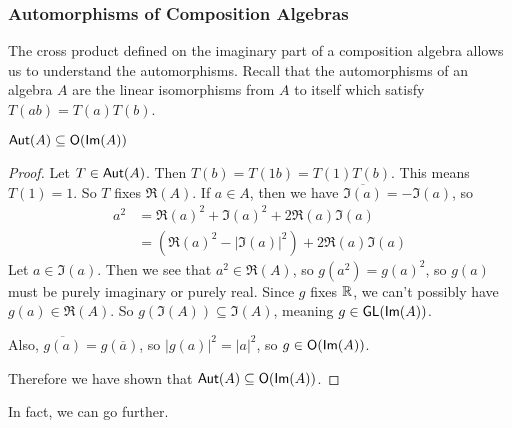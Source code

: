 \subsubsection{Automorphisms of Composition Algebras}
The cross product defined on the imaginary part of a composition algebra allows us to understand the automorphisms. Recall that the automorphisms of an algebra $A$ are the linear isomorphisms from $A$ to itself which satisfy $T(ab)=T(a)T(b)$.
\begin{lemma}
    $\operatorname{\textsf{Aut}}(A) \subseteq \operatorname{\textsf{O}}(\textsf{Im}(A))$
\end{lemma}
\begin{proof}
    Let $T\in \operatorname{\textsf{Aut}}(A)$. Then $T(b)=T(1b)=T(1)T(b)$. This means $T(1)=1$. So $T$ fixes $\Re(A)$. If $a\in A$, then we have $\overline{\Im(a)} = -\Im(a)$, so
    \begin{align*}
        a^2 &= \Re(a)^2+\Im(a)^2 + 2\Re(a)\Im(a)\\&= (\Re(a)^2-|\Im(a)|^2) + 2\Re(a)\Im(a)
    \end{align*}
    Let $a \in \Im(a)$. Then we see that $a^2 \in \Re(A)$, so $g(a^2)=g(a)^2$, so $g(a)$ must be purely imaginary or purely real. Since $g$ fixes $\operatorname{\mathbb{R}}$, we can't possibly have $g(a) \in \Re(A)$. So $g(\Im(A))\subseteq \Im(A)$, meaning $g \in \operatorname{\textsf{GL}}(\textsf{Im}(A))$.

    Also, $\overline{g(a)} = g(\overline{a})$, so $|g(a)|^2 = |a|^2$, so $g \in \operatorname{\textsf{O}}(\textsf{Im}(A))$.

    Therefore we have shown that $\operatorname{\textsf{Aut}}(A) \subseteq \operatorname{\textsf{O}}(\textsf{Im}(A))$.
\end{proof}
In fact, we can go further.

